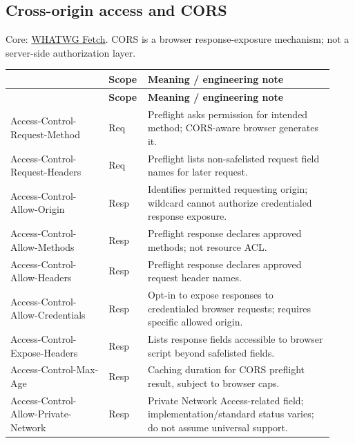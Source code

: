\documentclass[10pt,letterpaper,oneside]{article}
\newcommand{\stdlink}[2]{\href{#1}{#2}}
\newcommand{\cataloghead}{\toprule\rowcolor{Navy}\multicolumn{1}{>{\columncolor{Navy}}p{0.291\linewidth}}{\color{white}\sffamily\bfseries Field} & \color{white}\sffamily\bfseries Scope & \color{white}\sffamily\bfseries Meaning / engineering note \\ \midrule}
\newcommand{\catalogstart}{\begingroup\footnotesize\setlength{\LTpre}{0.15em}\setlength{\LTpost}{0.6em}\begin{longtable}{>{\RaggedRight\arraybackslash}p{0.291\linewidth}>{\RaggedRight\arraybackslash}p{0.085\linewidth}>{\RaggedRight\arraybackslash}p{0.555\linewidth}}\cataloghead\endfirsthead\cataloghead\endhead}
\newcommand{\catalogend}{\bottomrule\end{longtable}\endgroup}
\begin{document}
\subsection{Cross-origin access and CORS}
\begin{tipbox}\footnotesize Core: \stdlink{https://fetch.spec.whatwg.org/}{WHATWG Fetch}. CORS is a browser response-exposure mechanism; not a server-side authorization layer.\end{tipbox}
\catalogstart
{\ttfamily\color{Deep}Access-\allowbreak{}Control-\allowbreak{}Request-\allowbreak{}Method} & {\sffamily\scriptsize\color{Muted}Req} & Preflight asks permission for intended method; CORS-aware browser generates it. \\ \midrule
{\ttfamily\color{Deep}Access-\allowbreak{}Control-\allowbreak{}Request-\allowbreak{}Headers} & {\sffamily\scriptsize\color{Muted}Req} & Preflight lists non-safelisted request field names for later request. \\ \midrule
{\ttfamily\color{Deep}Access-\allowbreak{}Control-\allowbreak{}Allow-\allowbreak{}Origin} & {\sffamily\scriptsize\color{Muted}Resp} & Identifies permitted requesting origin; wildcard cannot authorize credentialed response exposure. \\ \midrule
{\ttfamily\color{Deep}Access-\allowbreak{}Control-\allowbreak{}Allow-\allowbreak{}Methods} & {\sffamily\scriptsize\color{Muted}Resp} & Preflight response declares approved methods; not resource ACL. \\ \midrule
{\ttfamily\color{Deep}Access-\allowbreak{}Control-\allowbreak{}Allow-\allowbreak{}Headers} & {\sffamily\scriptsize\color{Muted}Resp} & Preflight response declares approved request header names. \\ \midrule
{\ttfamily\color{Deep}Access-\allowbreak{}Control-\allowbreak{}Allow-\allowbreak{}Credentials} & {\sffamily\scriptsize\color{Muted}Resp} & Opt-in to expose responses to credentialed browser requests; requires specific allowed origin. \\ \midrule
{\ttfamily\color{Deep}Access-\allowbreak{}Control-\allowbreak{}Expose-\allowbreak{}Headers} & {\sffamily\scriptsize\color{Muted}Resp} & Lists response fields accessible to browser script beyond safelisted fields. \\ \midrule
{\ttfamily\color{Deep}Access-\allowbreak{}Control-\allowbreak{}Max-\allowbreak{}Age} & {\sffamily\scriptsize\color{Muted}Resp} & Caching duration for CORS preflight result, subject to browser caps. \\ \midrule
{\ttfamily\color{Deep}Access-\allowbreak{}Control-\allowbreak{}Allow-\allowbreak{}Private-\allowbreak{}Network} & {\sffamily\scriptsize\color{Muted}Resp} & Private Network Access-related field; implementation/standard status varies; do not assume universal support. \\ \midrule
\catalogend
\end{document}
